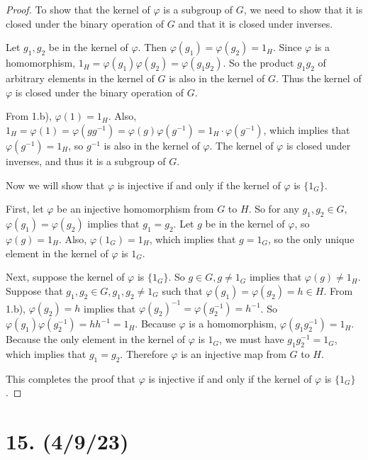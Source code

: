 \documentclass{article}
\begin{document}
\begin{proof}
    To show that the kernel of $\varphi$ is a subgroup of $G$, we need to show that it is closed under the binary operation of $G$ and that it is closed under inverses.

    Let $g_1, g_2$ be in the kernel of $\varphi$. Then $\varphi(g_1) = \varphi(g_2) = 1_H$. Since $\varphi$ is a homomorphism, $1_H = \varphi(g_1) \varphi(g_2) = \varphi(g_1 g_2).$ So the product $g_1 g_2$ of arbitrary elements in the kernel of $G$ is also in the kernel of $G$. Thus the kernel of $\varphi$ is closed under the binary operation of $G$.

    From 1.b), $\varphi(1) = 1_H$. Also, $1_H = \varphi(1) = \varphi(g g^{-1}) = \varphi(g) \varphi(g^{-1}) = 1_H \cdot \varphi(g^{-1})$, which implies that $\varphi(g^{-1}) = 1_H$, so $g^{-1}$ is also in the kernel of $\varphi$. The kernel of $\varphi$ is closed under inverses, and thus it is a subgroup of $G$.

    Now we will show that $\varphi$ is injective if and only if the kernel of $\varphi$ is $\{ 1_G \}$.

    First, let $\varphi$ be an injective homomorphism from $G$ to $H$. So for any $g_1, g_2 \in G$, $\varphi(g_1) = \varphi(g_2)$ implies that $g_1 = g_2$. Let $g$ be in the kernel of $\varphi$, so $\varphi(g) = 1_H$. Also, $\varphi(1_G) = 1_H$, which implies that $g = 1_G$, so the only unique element in the kernel of $\varphi$ is $1_G$.

    Next, suppose the kernel of $\varphi$ is $\{ 1_G \}$. So $g \in G, g \neq 1_G$ implies that $\varphi(g) \neq 1_H$. Suppose that $g_1, g_2 \in G, g_1, g_2 \neq 1_G$ such that $\varphi(g_1) = \varphi(g_2) = h \in H$. From 1.b), $\varphi(g_2) = h$ implies that $\varphi(g_2)^{-1} = \varphi(g_2^{-1}) = h^{-1}$. So $\varphi(g_1) \varphi(g_2^{-1}) = h h^{-1} = 1_H$. Because $\varphi$ is a homomorphism, $\varphi(g_1 g_2^{-1}) = 1_H$. Because the only element in the kernel of $\varphi$ is $1_G$, we must have $g_1 g_2^{-1} = 1_G$, which implies that $g_1 = g_2$. Therefore $\varphi$ is an injective map from $G$ to $H$.
    
    This completes the proof that $\varphi$ is injective if and only if the kernel of $\varphi$ is $\{ 1_G \}$.
\end{proof}

\section*{15. (4/9/23)}
\end{document}
